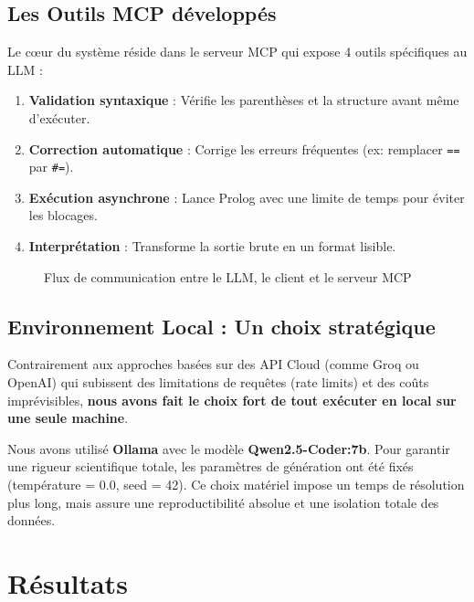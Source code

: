 \documentclass[12pt,a4paper]{article}
\begin{document}
\subsection{Les Outils MCP développés}
Le cœur du système réside dans le serveur MCP qui expose 4 outils spécifiques au LLM :
\begin{enumerate}
    \item \textbf{Validation syntaxique} : Vérifie les parenthèses et la structure avant même d'exécuter.
    \item \textbf{Correction automatique} : Corrige les erreurs fréquentes (ex: remplacer \texttt{==} par \texttt{\#=}).
    \item \textbf{Exécution asynchrone} : Lance Prolog avec une limite de temps pour éviter les blocages.
    \item \textbf{Interprétation} : Transforme la sortie brute en un format lisible.
\end{enumerate}

\begin{figure}[H]
    \centering
    \vspace{4cm} %
    \caption{Flux de communication entre le LLM, le client et le serveur MCP}
    \label{fig:mcp_flow}
\end{figure}

\subsection{Environnement Local : Un choix stratégique}
Contrairement aux approches basées sur des API Cloud (comme Groq ou OpenAI) qui subissent des limitations de requêtes (rate limits) et des coûts imprévisibles, \textbf{nous avons fait le choix fort de tout exécuter en local sur une seule machine}. 

Nous avons utilisé \textbf{Ollama} avec le modèle \textbf{Qwen2.5-Coder:7b}. Pour garantir une rigueur scientifique totale, les paramètres de génération ont été fixés (température = 0.0, seed = 42). Ce choix matériel impose un temps de résolution plus long, mais assure une reproductibilité absolue et une isolation totale des données.

\section{Résultats}
\end{document}
